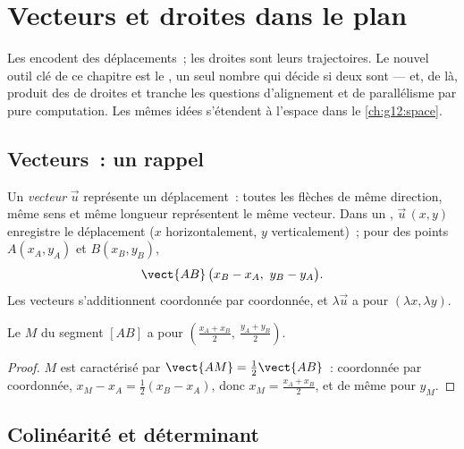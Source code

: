 \chapter{Vecteurs et droites dans le plan}\label{ch:g11:vect}

Les  encodent des déplacements~; les droites sont leurs
trajectoires. Le nouvel outil clé de ce chapitre est le
\emph{}, un seul nombre qui décide si deux  sont
 --- et, de là, produit des  de droites et tranche les
questions d'alignement et de parallélisme par pure computation. Les mêmes
idées s'étendent à l'espace dans le \cref{ch:g12:space}.

\section{Vecteurs~: un rappel}

\begin{definition}\label{def:g11:vect:vector}
Un \emph{vecteur} $\vec u$ représente un déplacement~:
toutes les flèches de même direction, même sens et même longueur
représentent le même vecteur. Dans un , $\vec u\,(x, y)$ enregistre
le déplacement ($x$ horizontalement, $y$ verticalement)~; pour des points
$A(x_A, y_A)$ et $B(x_B, y_B)$,
\[
\vect{AB}\,\bigl(x_B - x_A,\ y_B - y_A\bigr).
\]
Les vecteurs s'additionnent coordonnée par coordonnée, et $\lambda\vec u$
a pour  $(\lambda x, \lambda y)$.
\end{definition}

\begin{proposition}[Milieu]\label{prop:g11:vect:midpoint}
Le  $M$ du segment $[AB]$ a pour 
$\left(\frac{x_A + x_B}{2},\ \frac{y_A + y_B}{2}\right)$.
\end{proposition}

\begin{proof}
$M$ est caractérisé par $\vect{AM} = \frac12\vect{AB}$~: coordonnée par
coordonnée, $x_M - x_A = \frac12(x_B - x_A)$, donc
$x_M = \frac{x_A + x_B}{2}$, et de même pour $y_M$.
\end{proof}

\section{Colinéarité et déterminant}

